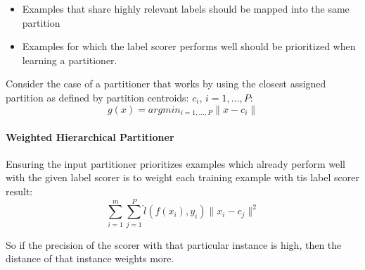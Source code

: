 \begin{itemize}
    \item Examples that share highly relevant labels should be mapped into
        the same partition
    \item Examples for which the label scorer performs well should be
        prioritized when learning a partitioner.
\end{itemize}

Consider the case of a partitioner that works by using the closest
assigned partition as defined by partition centroids:
$c_i$, $i = 1, \dots, P$:
\begin{equation}
    g(x) = argmin_{i=1,\dots, P}\|x - c_i\|
\end{equation}

\paragraph{Weighted Hierarchical Partitioner}
Ensuring the input partitioner prioritizes examples which already perform
well with the given label scorer is to weight each training example with
tis label scorer result:
\begin{equation}
    \sum_{i=1}^m\sum_{j=1}^P \hat{l}(f(x_i), y_i) \|x_i - c_j\|^2
\end{equation}

So if the precision of the scorer with that particular instance is high,
then the distance of that instance weights more.
